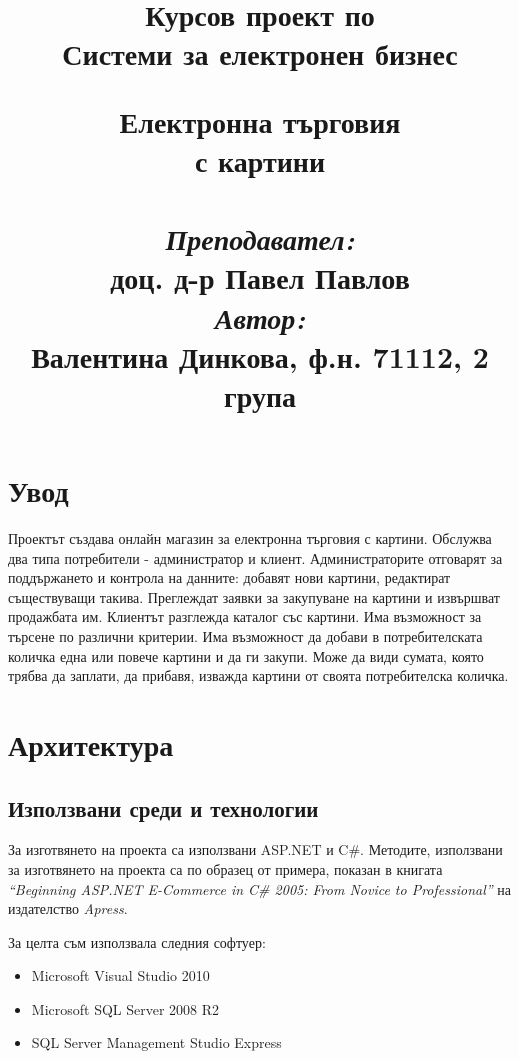 \documentclass[a4paper,14pt]{article}
\title{
\vspace{2.0cm}
\begin{large}
Курсов проект по \\
Системи за електронен бизнес
\end{large}
\vspace{2.5cm}
\hline
\vspace{0.5cm}
\textbf{Електронна търговия
\\ \vspace{0.5cm} с картини}
\vspace{0.5cm}
\hline
\\ \vspace{2.5cm}
\\ \vspace{0.5cm}\Large{\textit{Преподавател:} \\ доц. д-р Павел Павлов}
\\ \vspace{1.0cm}\Large{\textit{Автор:} \\ Валентина Динкова, ф.н. 71112, 2 група}}
\begin{document}
\maketitle

\newpage

\tableofcontents

\newpage
\section{Увод}
Проектът създава онлайн магазин за електронна търговия с картини. Обслужва два типа потребители - администратор и клиент. Администраторите отговарят
за поддържането и контрола на данните: добавят нови картини, редактират съществуващи такива. Преглеждат заявки за закупуване на картини
и извършват продажбата им. Клиентът разглежда каталог със картини. Има възможност за
търсене по различни критерии. Има възможност да добави в потребителската количка една или повече картини и да ги закупи. Може да види сумата, която трябва да заплати, да прибавя, изважда картини от своята потребителска количка.


\section{Архитектура}


\subsection{Използвани среди и технологии}
За изготвянето на проекта са използвани ASP.NET и C\#. Методите, използвани за изготвянето на проекта са по образец от примера,
 показан в книгата \textit{“Beginning ASP.NET E-Commerce in C\# 2005: From Novice to Professional”} на издателство \textit{Apress}.
 
 За целта съм използвала следния софтуер:
 \begin{itemize}
\item
Microsoft Visual Studio 2010
\item
Microsoft SQL Server 2008 R2
\item
SQL Server Management Studio Express
\end{itemize}
\end{document}
